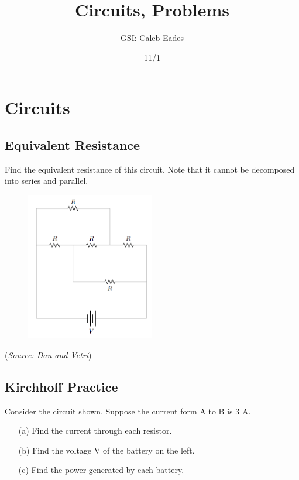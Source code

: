 \documentclass{article}
\begin{document}
\title{Circuits, Problems}
\author{GSI: Caleb Eades}
\date{11/1}
\maketitle

\section{Circuits}

\subsection{Equivalent Resistance}

Find the equivalent resistance of this circuit. Note that it cannot be decomposed into series and parallel.

\begin{figure}[h]
	\begin{center}
	\includegraphics[width=0.5\textwidth]{Circuit.png}
	\end{center}
\end{figure}

(\textit{Source: Dan and Vetri})

\subsection{Kirchhoff Practice}

Consider the circuit shown. Suppose the current form A to B is 3 A.
\begin{itemize}
	\item[(a)] Find the current through each resistor.
	\item[(b)] Find the voltage V of the battery on the left.
	\item[(c)] Find the power generated by each battery.
\end{itemize}
\end{document}

